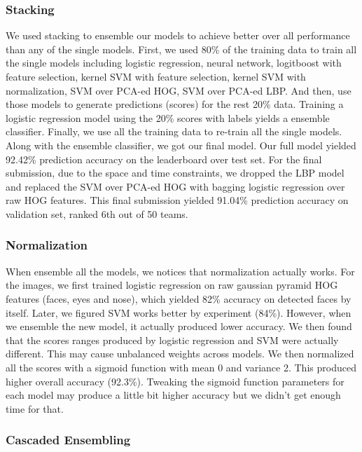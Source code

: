 \subsubsection{Stacking}
We used stacking to ensemble our models to achieve better over all performance than any of the single models. First, we used 80\% of the training data to train all the single models including logistic regression, neural network, logitboost with feature selection, kernel SVM with feature selection, kernel SVM with normalization, SVM over PCA-ed HOG, SVM over PCA-ed LBP. And then, use those models to generate predictions (scores) for the rest 20\% data. Training a logistic regression model using the 20\% scores with labels yields a ensemble classifier. Finally, we use all the training data to re-train all the single models. Along with the ensemble classifier, we got our final model. Our full model yielded 92.42\% prediction accuracy on the leaderboard over test set. For the final submission, due to the space and time constraints, we dropped the LBP model and replaced the SVM over PCA-ed HOG with bagging logistic regression over raw HOG features. This final submission yielded 91.04\% prediction accuracy on validation set, ranked 6th out of 50 teams.
\subsubsection{Normalization}
When ensemble all the models, we notices that normalization actually works. For the images, we first trained logistic regression on raw gaussian pyramid HOG features (faces, eyes and nose), which yielded 82\% accuracy on detected faces by itself. Later, we figured SVM works better by experiment (84\%). However, when we ensemble the new model, it actually produced lower accuracy. We then found that the scores ranges produced by logistic regression and SVM were actually different. This may cause unbalanced weights across models. We then normalized all the scores with a sigmoid function with mean 0 and variance 2. This produced higher overall accuracy (92.3\%). Tweaking the sigmoid function parameters for each model may produce a little bit higher accuracy but we didn't get enough time for that.
\subsubsection{Cascaded Ensembling}


